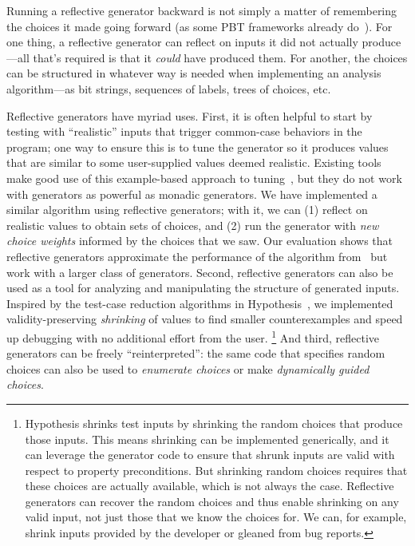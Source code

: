 Running a reflective generator backward is not simply a matter of remembering
the choices it made going forward (as some PBT frameworks already
do~\cite{maciver2019hypothesis, hatfield-dodds_hypofuzz_nodate}). For one thing,
a reflective
generator can reflect on inputs it did not actually
produce---all that's required is that it {\em could} have produced
them.  For another, the choices can be structured in whatever way is needed
when implementing an analysis algorithm---as bit
strings, sequences of labels, trees of choices, etc.

Reflective generators have myriad uses.  First,
%
it is often helpful to start by testing with
``realistic'' inputs that trigger common-case behaviors in the program;
one way to ensure this is to tune the generator so
it produces values that are similar to some user-supplied values deemed
realistic. Existing tools make good use of this example-based approach to
tuning~\cite{soremekun2020inputs}, but they do not work with generators as
powerful as monadic generators. We have implemented a
similar algorithm using
reflective generators; with it, we can (1) reflect on realistic values to
obtain sets of choices, and (2) run the generator with {\em new choice weights}
informed by the choices that we saw. Our evaluation shows that reflective
generators approximate the performance of the algorithm
from~\cite{soremekun2020inputs} but work with a larger class of generators.
%
Second,
reflective generators can also be used as a tool for analyzing and
manipulating the structure of generated inputs. Inspired by the test-case
reduction algorithms in Hypothesis~\cite{maciver_test-case_2020}, we
implemented
validity-preserving {\em shrinking} of values to find smaller counterexamples
and speed up debugging with no additional effort from the user.%
%
\footnote{%
\normalsize
Hypothesis shrinks test inputs by shrinking the random choices
that produce those
inputs. This means shrinking can be implemented
generically, and it can leverage the generator code to ensure that shrunk
inputs are valid with respect to property preconditions.  But shrinking
random choices requires that these choices are actually available, which
is not always the case. Reflective generators
can
recover the random choices and thus enable shrinking
on any
valid input, not just those that we know the choices for.  We can, for
example, shrink inputs provided by the developer or
gleaned from bug reports.
}
%
And third, reflective generators can be freely
``reinterpreted'': the same code that specifies random choices can
also be used to {\em enumerate choices} or make {\em dynamically guided
choices}.

